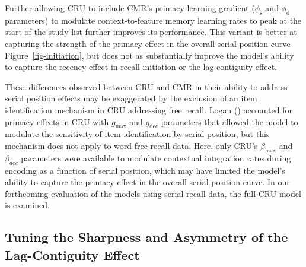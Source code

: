 \documentclass[
  man,
  floatsintext,
  longtable,
  nolmodern,
  notxfonts,
  notimes,
  draftfirst,
  colorlinks=true,linkcolor=blue,citecolor=blue,urlcolor=blue]{apa7}
\begin{document}
Further allowing CRU to include CMR's primacy learning gradient
(\(\phi_\text{s}\) and \(\phi_\text{d}\) parameters) to modulate
context-to-feature memory learning rates to peak at the start of the
study list further improves its performance. This variant is better at
capturing the strength of the primacy effect in the overall serial
position curve Figure~\ref{fig-initiation}, but does not as
substantially improve the model's ability to capture the recency effect
in recall initiation or the lag-contiguity effect.

These differences observed between CRU and CMR in their ability to
address serial position effects may be exaggerated by the exclusion of
an item identification mechanism in CRU addressing free recall. Logan
() accounted for primacy effects in
CRU with \(g_\text{max}\) and \(g_\text{dec}\) parameters that allowed
the model to modulate the sensitivity of item identification by serial
position, but this mechanism does not apply to word free recall data.
Here, only CRU's \(\beta_\text{max}\) and \(\beta_{dec}\) parameters
were available to modulate contextual integration rates during encoding
as a function of serial position, which may have limited the model's
ability to capture the primacy effect in the overall serial position
curve. In our forthcoming evaluation of the models using serial recall
data, the full CRU model is examined.

\subsection{Tuning the Sharpness and Asymmetry of the Lag-Contiguity
Effect}\label{tuning-the-sharpness-and-asymmetry-of-the-lag-contiguity-effect}
\end{document}
